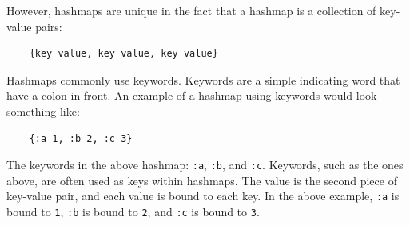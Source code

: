 \documentclass[12pt]{article}
\newcommand{\comment}[1]{{\bf \tt  {#1}}}
\newcommand{\emcomment}[1]{\textcolor{ForestGreen}{\comment{Elena: {#1}}}}
\begin{document}


However, hashmaps are unique in the fact that a hashmap is a collection of key-value pairs: 
\begin{verbatim}
	{key value, key value, key value}
\end{verbatim}

Hashmaps commonly use keywords. Keywords are a simple indicating word that have a colon in front.
An example of a hashmap using keywords would look something like: 
\begin{verbatim}
	{:a 1, :b 2, :c 3}
\end{verbatim}

The keywords in the above hashmap: \texttt{:a}, \texttt{:b}, and \texttt{:c}. Keywords, such as the
ones above, are often used as keys within hashmaps. The value is the second piece of key-value pair,
and each value is bound to each key. In the above example, \texttt{:a} is bound to \texttt{1},
\texttt{:b} is bound to \texttt{2}, and \texttt{:c} is bound to \texttt{3}.
\end{document}
